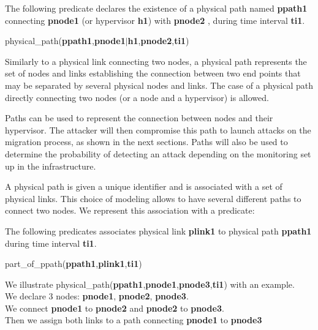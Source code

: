 The following predicate declares the existence of a physical path named \textbf{ppath1} connecting \textbf{pnode1} (or hypervisor \textbf{h1}) with \textbf{pnode2} , during time interval \textbf{ti1}. 
\begin{myformula}
physical\_path(\textbf{ppath1},\textbf{pnode1}$\vert$\textbf{h1},\textbf{pnode2},\textbf{ti1})
\end{myformula}


Similarly to a physical link connecting two nodes, a physical path represents the set of nodes and links establishing the connection between two end points that may be separated by several physical nodes and links.
The case of a physical path directly connecting two nodes (or a node and a hypervisor) is allowed.

Paths can be used to represent the connection between nodes and their hypervisor.
The attacker will then compromise this path to launch attacks on the migration process, as shown in the next sections. Paths will also be used to determine the probability of detecting an attack depending on the monitoring set up in the infrastructure.

A physical path is given a unique identifier and is associated with a set of physical links. 
This choice of modeling allows to have several different paths to connect two nodes. 
We represent this association with a predicate:

The following predicates associates physical link \textbf{plink1} to physical path \textbf{ppath1} during time interval \textbf{ti1}.
\begin{myformula}
part\_of\_ppath(\textbf{ppath1},\textbf{plink1},\textbf{ti1})
\end{myformula}


We illustrate physical\_path(\textbf{ppath1},\textbf{pnode1},\textbf{pnode3},\textbf{ti1}) with an example.\\
We declare 3 nodes: \textbf{pnode1}, \textbf{pnode2}, \textbf{pnode3}.\\
We connect \textbf{pnode1} to \textbf{pnode2} and \textbf{pnode2} to \textbf{pnode3}.\\
Then we assign both links to a path connecting \textbf{pnode1} to \textbf{pnode3}

